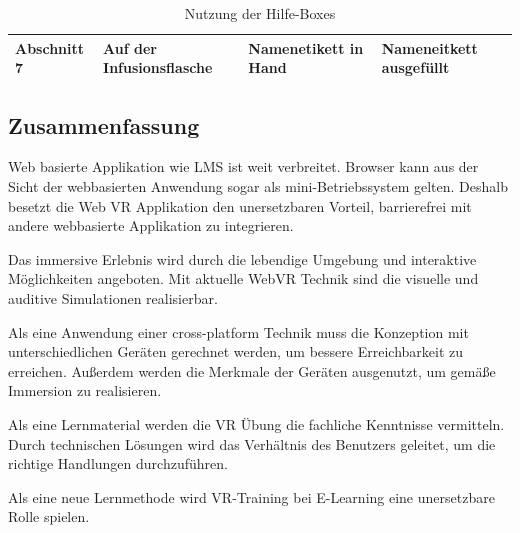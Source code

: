 \begin{table}[]
{\begin{tabular}{llll}
Abschnitt 7 & Auf der Infusionsflasche                                                         & Namenetikett in Hand                                                                                     & Nameneitkett ausgefüllt                                                                                  \\ \hline
\end{tabular}%
}
\caption{Nutzung der Hilfe-Boxes}
\label{my-label}
\end{table}

  
\subsection{Zusammenfassung}
Web basierte Applikation wie LMS ist weit verbreitet. Browser kann aus der Sicht der webbasierten Anwendung sogar als mini-Betriebssystem gelten. Deshalb besetzt die Web VR Applikation den unersetzbaren Vorteil, barrierefrei mit andere webbasierte Applikation zu integrieren.

Das immersive Erlebnis wird durch die lebendige Umgebung und interaktive Möglichkeiten angeboten. Mit aktuelle WebVR Technik sind die visuelle und auditive Simulationen realisierbar.

Als eine Anwendung einer cross-platform Technik muss die Konzeption mit unterschiedlichen Geräten gerechnet werden, um bessere Erreichbarkeit zu erreichen. Außerdem werden die Merkmale der Geräten ausgenutzt, um gemäße Immersion zu realisieren.

Als eine Lernmaterial werden die VR Übung die fachliche Kenntnisse vermitteln. Durch technischen Lösungen wird das Verhältnis des Benutzers geleitet, um die richtige Handlungen durchzuführen.

Als eine neue Lernmethode wird VR-Training bei E-Learning eine unersetzbare Rolle spielen.
